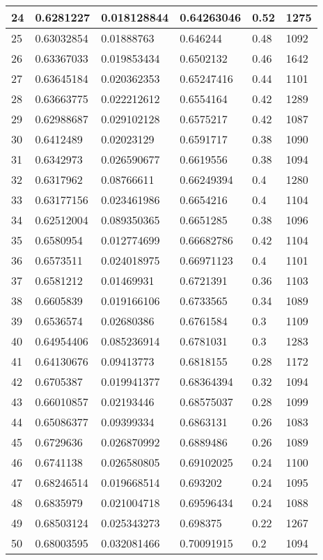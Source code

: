 \begin{longtable}{|l|l|l|l|l|l|}
24 & 0.6281227 & 0.018128844 & 0.64263046 & 0.52 & 1275 \\ \hline 
25 & 0.63032854 & 0.01888763 & 0.646244 & 0.48 & 1092 \\ \hline 
26 & 0.63367033 & 0.019853434 & 0.6502132 & 0.46 & 1642 \\ \hline 
27 & 0.63645184 & 0.020362353 & 0.65247416 & 0.44 & 1101 \\ \hline 
28 & 0.63663775 & 0.022212612 & 0.6554164 & 0.42 & 1289 \\ \hline 
29 & 0.62988687 & 0.029102128 & 0.6575217 & 0.42 & 1087 \\ \hline 
30 & 0.6412489 & 0.02023129 & 0.6591717 & 0.38 & 1090 \\ \hline 
31 & 0.6342973 & 0.026590677 & 0.6619556 & 0.38 & 1094 \\ \hline 
32 & 0.6317962 & 0.08766611 & 0.66249394 & 0.4 & 1280 \\ \hline 
33 & 0.63177156 & 0.023461986 & 0.6654216 & 0.4 & 1104 \\ \hline 
34 & 0.62512004 & 0.089350365 & 0.6651285 & 0.38 & 1096 \\ \hline 
35 & 0.6580954 & 0.012774699 & 0.66682786 & 0.42 & 1104 \\ \hline 
36 & 0.6573511 & 0.024018975 & 0.66971123 & 0.4 & 1101 \\ \hline 
37 & 0.6581212 & 0.01469931 & 0.6721391 & 0.36 & 1103 \\ \hline 
38 & 0.6605839 & 0.019166106 & 0.6733565 & 0.34 & 1089 \\ \hline 
39 & 0.6536574 & 0.02680386 & 0.6761584 & 0.3 & 1109 \\ \hline 
40 & 0.64954406 & 0.085236914 & 0.6781031 & 0.3 & 1283 \\ \hline 
41 & 0.64130676 & 0.09413773 & 0.6818155 & 0.28 & 1172 \\ \hline 
42 & 0.6705387 & 0.019941377 & 0.68364394 & 0.32 & 1094 \\ \hline 
43 & 0.66010857 & 0.02193446 & 0.68575037 & 0.28 & 1099 \\ \hline 
44 & 0.65086377 & 0.09399334 & 0.6863131 & 0.26 & 1083 \\ \hline 
45 & 0.6729636 & 0.026870992 & 0.6889486 & 0.26 & 1089 \\ \hline 
46 & 0.6741138 & 0.026580805 & 0.69102025 & 0.24 & 1100 \\ \hline 
47 & 0.68246514 & 0.019668514 & 0.693202 & 0.24 & 1095 \\ \hline 
48 & 0.6835979 & 0.021004718 & 0.69596434 & 0.24 & 1088 \\ \hline 
49 & 0.68503124 & 0.025343273 & 0.698375 & 0.22 & 1267 \\ \hline 
50 & 0.68003595 & 0.032081466 & 0.70091915 & 0.2 & 1094 \\ \hline 
\end{longtable}
